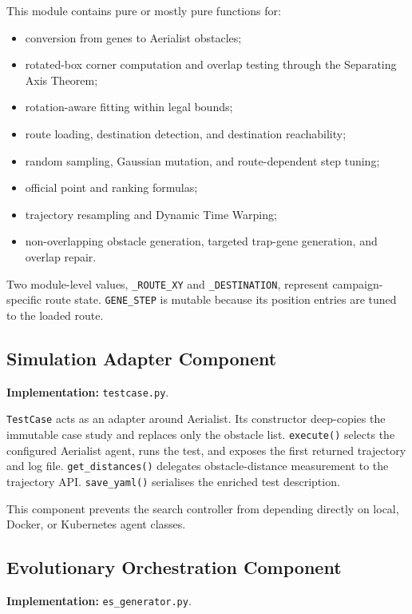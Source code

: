 \documentclass[11pt,a4paper]{report}
\newcommand{\code}[1]{\texttt{#1}}
\begin{document}
This module contains pure or mostly pure functions for:
\begin{itemize}
  \item conversion from genes to Aerialist obstacles;
  \item rotated-box corner computation and overlap testing through the Separating Axis Theorem;
  \item rotation-aware fitting within legal bounds;
  \item route loading, destination detection, and destination reachability;
  \item random sampling, Gaussian mutation, and route-dependent step tuning;
  \item official point and ranking formulas;
  \item trajectory resampling and Dynamic Time Warping;
  \item non-overlapping obstacle generation, targeted trap-gene generation, and overlap repair.
\end{itemize}

Two module-level values, \code{\_ROUTE\_XY} and \code{\_DESTINATION}, represent campaign-specific route state. \code{GENE\_STEP} is mutable because its position entries are tuned to the loaded route.

\subsection{Simulation Adapter Component}
\textbf{Implementation:} \code{testcase.py}.

\code{TestCase} acts as an adapter around Aerialist. Its constructor deep-copies the immutable case study and replaces only the obstacle list. \code{execute()} selects the configured Aerialist agent, runs the test, and exposes the first returned trajectory and log file. \code{get\_distances()} delegates obstacle-distance measurement to the trajectory API. \code{save\_yaml()} serialises the enriched test description.

This component prevents the search controller from depending directly on local, Docker, or Kubernetes agent classes.

\subsection{Evolutionary Orchestration Component}
\textbf{Implementation:} \code{es\_generator.py}.
\end{document}
